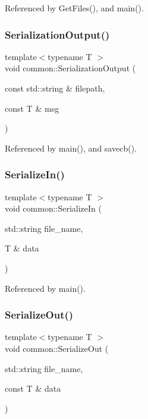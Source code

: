 Referenced by Get\+Files(), and main().

\mbox{\label{namespacecommon_ab793b440cdf411b716bde82330d2b364}} 
\subsubsection{\texorpdfstring{Serialization\+Output()}{SerializationOutput()}}
{\footnotesize\ttfamily template$<$typename T $>$ \\
void common\+::\+Serialization\+Output (\begin{DoxyParamCaption}\item[{const std\+::string \&}]{filepath,  }\item[{const T \&}]{msg }\end{DoxyParamCaption})}



Referenced by main(), and savecb().

\mbox{\label{namespacecommon_aa28e88e788569055b2217ed26e48f922}} 
\subsubsection{\texorpdfstring{Serialize\+In()}{SerializeIn()}}
{\footnotesize\ttfamily template$<$typename T $>$ \\
void common\+::\+Serialize\+In (\begin{DoxyParamCaption}\item[{std\+::string}]{file\+\_\+name,  }\item[{T \&}]{data }\end{DoxyParamCaption})}



Referenced by main().

\mbox{\label{namespacecommon_adac07f1443b546753894f4466ae7d051}} 
\subsubsection{\texorpdfstring{Serialize\+Out()}{SerializeOut()}}
{\footnotesize\ttfamily template$<$typename T $>$ \\
void common\+::\+Serialize\+Out (\begin{DoxyParamCaption}\item[{std\+::string}]{file\+\_\+name,  }\item[{const T \&}]{data }\end{DoxyParamCaption})}



